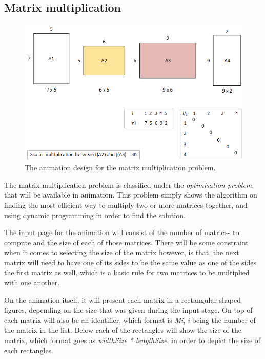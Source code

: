 
%


\subsection{Matrix multiplication}

\begin{figure}[H]
\centering
\includegraphics[scale=0.9]{images/report_images/animationDesignMatrixMultiplication.png}
\caption{The animation design for the matrix multiplication problem.}
\label{animationDesignMatrixMultiplication}
\end{figure}

The matrix multiplication problem is classified under the \textit{optimisation problem}, that will be available in animation. This problem simply shows the algorithm on finding the most efficient way to multiply two or more matrices together, and using dynamic programming in order to find the solution. 

The input page for the animation will consist of the number of matrices to compute and the size of each of those matrices. There will be some constraint when it comes to selecting the size of the matrix however, is that, the next matrix will need to have one of its sides to be the same value as one of the sides the first matrix as well, which is a basic rule for two matrices to be multiplied with one another.

On the animation itself, it will present each matrix in a rectangular shaped figures, depending on the size that was given during the input stage. On top of each matrix will also be an identifier, which format is \textit{Mi}, \textit{i} being the number of the matrix in the list. Below each of the rectangles will show the size of the matrix, which format goes as \textit{widthSize * lengthSize}, in order to depict the size of each rectangles.

